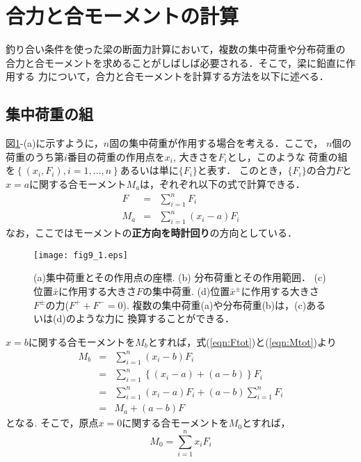 \documentclass[10pt,a4j]{jbook}
\begin{document}
\section{合力と合モーメントの計算}
釣り合い条件を使った梁の断面力計算において，複数の集中荷重や分布荷重の
合力と合モーメントを求めることがしばしば必要される．そこで，梁に鉛直に作用する
力について，合力と合モーメントを計算する方法を以下に述べる．
\subsection{集中荷重の組}
図\ref{fig:fig9_1}-(a)に示すように，$n$固の集中荷重が作用する場合を考える．ここで，
$n$個の荷重のうち第$i$番目の荷重の作用点を$x_i$, 大きさを$F_i$とし，このような
荷重の組を$\left\{ \left(x_i, F_i\right), i=1,\dots ,n\right\}$あるいは単に$\{F_i\}$と表す．
このとき，$\{F_i\}$の合力$F$と$x=a$に関する合モーメント$M_a$は，ぞれぞれ以下の式で計算できる．
\begin{eqnarray}
	F &=& \sum_{i=1}^n F_i 
	\label{eqn:Ftot}
	\\
	M_a &=& \sum_{i=1}^n (x_i-a)F_i 
	\label{eqn:Mtot}
\end{eqnarray}
なお，ここではモーメントの{\bf 正方向を時計回り}の方向としている．
\begin{figure}[h]
	\begin{center}
	\texttt{[image: fig9\_1.eps]} 
	\end{center}
	\caption{
		(a)集中荷重とその作用点の座標. (b) 分布荷重とその作用範囲．
		(c)位置$\bar x$に作用する大きさ$F$の集中荷重. 
		(d)位置$\bar x^\pm$に作用する大きさ$F^\pm$の力($F^++F^-=0$). 
		複数の集中荷重(a)や分布荷重(b)は，(c)あるいは(d)のような力に
		換算することができる．
	} 
	\label{fig:fig9_1}
\end{figure}
$x=b$に関する合モーメントを$M_b$とすれば，式(\ref{eqn:Ftot})と(\ref{eqn:Mtot})より
\begin{eqnarray}
	M_b &=& \sum_{i=1}^n (x_i-b)F_i  \nonumber \\
	    &=& \sum_{i=1}^n \left\{ (x_i-a)+(a-b)\right\}F_i  \nonumber \\
	    &=& \sum_{i=1}^n (x_i-a)F_i +(a-b)\sum_{i=1}^n F_i  \nonumber \\
	    &=& M_a +(a-b)F 
	\label{eqn:Ma2b}
\end{eqnarray}
となる. そこで，原点$x=0$に関する合モーメントを$M_0$とすれば，
\begin{equation}
	M_0= \sum_{i=1}^n x_i F_i 
	\label{eqn:M0}
\end{equation}
\end{document}
